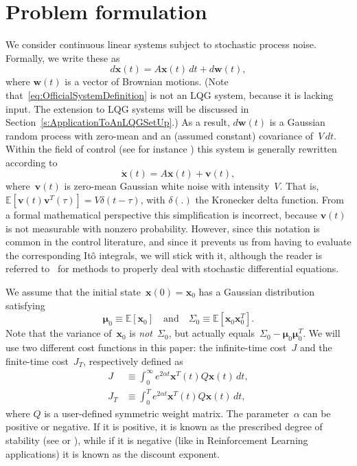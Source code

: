 \documentclass[twocolumn]{autart}
\newcommand{\ve}[1]{{\boldsymbol{#1}}} \newcommand{\tr}{\mbox{tr}} \newcommand{\ex}{\mathds{E}} \newcommand{\va}{\mathds{V}}
\begin{document}
\section{Problem formulation} \label{s:ProblemSetUp}

We consider continuous linear systems subject to stochastic process noise. Formally, we write these as
\begin{equation}\label{eq:OfficialSystemDefinition}
d\ve{x}(t) = A\ve{x}(t) \, dt + d\ve{w}(t),
\end{equation}
where $\ve{w}(t)$ is a vector of Brownian motions. (Note that~\eqref{eq:OfficialSystemDefinition} is not an LQG system, because it is lacking input. The extension to LQG systems will be discussed in Section~\ref{s:ApplicationToAnLQGSetUp}.) As a result, $d\ve{w}(t)$ is a Gaussian random process with zero-mean and an (assumed constant) covariance of~$V \, dt$. Within the field of control (see for instance \cite{MFCBook}) this system is generally rewritten according to
\begin{equation}
\ve{\dot{x}}(t) = A\ve{x}(t) + \ve{v}(t), \label{eq:SystemDefinition}
\end{equation}
where~$\ve{v}(t)$ is zero-mean Gaussian white noise with intensity~$V$. That is, $\ex[\ve{v}(t) \ve{v}^T(\tau)] = V \delta(t-\tau)$, with $\delta(.)$ the Kronecker delta function. From a formal mathematical perspective this simplification is incorrect, because $\ve{v}(t)$ is not measurable with nonzero probability. However, since this notation is common in the control literature, and since it prevents us from having to evaluate the corresponding It\^o integrals, we will stick with it, although the reader is referred to~\cite{StochasticDEBook} for methods to properly deal with stochastic differential equations.

We assume that the initial state~$\ve{x}(0) = \ve{x}_0$ has a Gaussian distribution satisfying
\begin{equation}
\ve{\mu}_0 \equiv \ex[\ve{x}_0] \hspace{12pt} \mbox{and} \hspace{12pt} \Sigma_0 \equiv \ex[\ve{x}_0 \ve{x}_0^T].
\end{equation}
Note that the variance of~$\ve{x}_0$ is \textit{not}~$\Sigma_0$, but actually equals~\mbox{$\Sigma_0 - \ve{\mu}_0 \ve{\mu}_0^T$}. We will use two different cost functions in this paper: the infinite-time cost~$J$ and the finite-time cost~$J_T$, respectively defined as
\begin{align}
J & \equiv \int_0^\infty e^{2\alpha t} \ve{x}^T(t) Q \ve{x}(t) \, dt, \label{eq:InfiniteTimeCostFunction} \\
J_T & \equiv \int_0^T e^{2\alpha t} \ve{x}^T(t) Q \ve{x}(t) \, dt, \label{eq:FiniteTimeCostFunction}
\end{align}
where $Q$ is a user-defined symmetric weight matrix. The parameter~$\alpha$ can be positive or negative. If it is positive, it is known as the prescribed degree of stability (see \cite{LQBook} or \cite{DMCSBook}), while if it is negative (like in Reinforcement Learning applications) it is known as the discount exponent.
\end{document}
